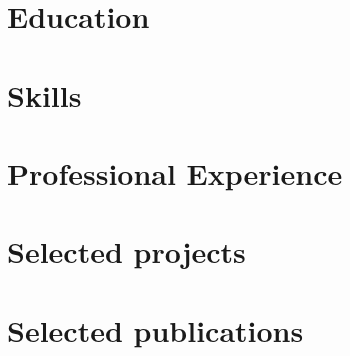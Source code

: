 \documentclass[letter,10pt]{article}
\begin{document}
\section{Education}


%

\section{Skills}


\section{Professional Experience}




\section{Selected projects}

\section{Selected publications}

\end{document}
